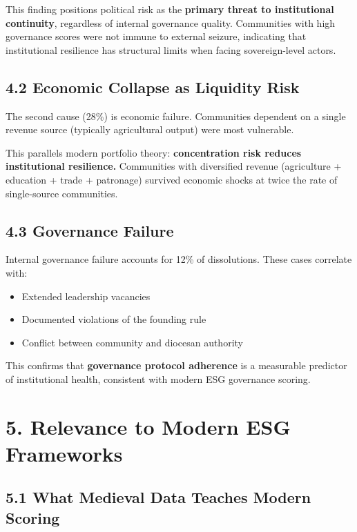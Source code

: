 \documentclass[
  11pt,
  a4paper,
]{article}
\providecommand{\tightlist}{%
  \setlength{\itemsep}{0pt}\setlength{\parskip}{0pt}}\usepackage{longtable,booktabs,array}
\begin{document}
This finding positions political risk as the \textbf{primary threat to
institutional continuity}, regardless of internal governance quality.
Communities with high governance scores were not immune to external
seizure, indicating that institutional resilience has structural limits
when facing sovereign-level actors.

\subsection{4.2 Economic Collapse as Liquidity
Risk}\label{economic-collapse-as-liquidity-risk}

The second cause (28\%) is economic failure. Communities dependent on a
single revenue source (typically agricultural output) were most
vulnerable.

This parallels modern portfolio theory: \textbf{concentration risk
reduces institutional resilience.} Communities with diversified revenue
(agriculture + education + trade + patronage) survived economic shocks
at twice the rate of single-source communities.

\subsection{4.3 Governance Failure}\label{governance-failure}

Internal governance failure accounts for 12\% of dissolutions. These
cases correlate with:

\begin{itemize}
\tightlist
\item
  Extended leadership vacancies
\item
  Documented violations of the founding rule
\item
  Conflict between community and diocesan authority
\end{itemize}

This confirms that \textbf{governance protocol adherence} is a
measurable predictor of institutional health, consistent with modern ESG
governance scoring.

\section{5. Relevance to Modern ESG
Frameworks}\label{relevance-to-modern-esg-frameworks}

\subsection{5.1 What Medieval Data Teaches Modern
Scoring}\label{what-medieval-data-teaches-modern-scoring}
\end{document}
